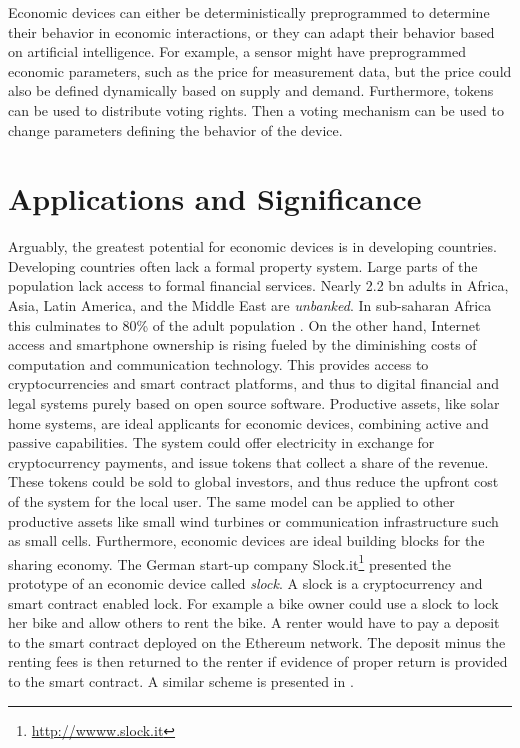 Economic devices can either be deterministically preprogrammed to determine their behavior in economic interactions, or they can adapt their behavior based on artificial intelligence. For example, a sensor might have preprogrammed economic parameters, such as the price for measurement data, but the price could also be defined dynamically based on supply and demand. Furthermore, tokens can be used to distribute voting rights. Then a voting mechanism can be used to change parameters defining the behavior of the device.

\section{Applications and Significance} 

Arguably, the greatest potential for economic devices is in developing countries. Developing countries often lack a formal property system. Large parts of the population lack access to formal financial services. Nearly 2.2 bn adults in Africa, Asia, Latin America, and the Middle East are \emph{unbanked}. In sub-saharan Africa this culminates to 80\% of the adult population \parencite{chaia2010counting}. On the other hand, Internet access and smartphone ownership is rising \parencite{poushter2016smartphone} fueled by the diminishing costs of computation and communication technology. This provides access to cryptocurrencies and smart contract platforms, and thus to digital financial and legal systems purely based on open source software.
Productive assets, like solar home systems, are ideal applicants for economic devices, combining active and passive capabilities. The system could offer electricity in exchange for cryptocurrency payments, and issue tokens that collect a share of the revenue. These tokens could be sold to global investors, and thus reduce the upfront cost of the system for the local user. The same model can be applied to other productive assets like small wind turbines or communication infrastructure such as small cells. 
Furthermore, economic devices are ideal building blocks for the sharing economy. The German start-up company Slock.it\footnote{\url{http://wwww.slock.it}} presented the prototype of an economic device called \emph{slock}. A slock is a cryptocurrency and smart contract enabled lock. For example a bike owner could use a slock to lock her bike and allow others to rent the bike. A renter would have to pay a deposit to the smart contract deployed on the Ethereum network. The deposit minus the renting fees is then returned to the renter if evidence of proper return is provided to the smart contract. A similar scheme is presented in \parencite{Bogner:2016:DSA:2991561.2998465}. 

